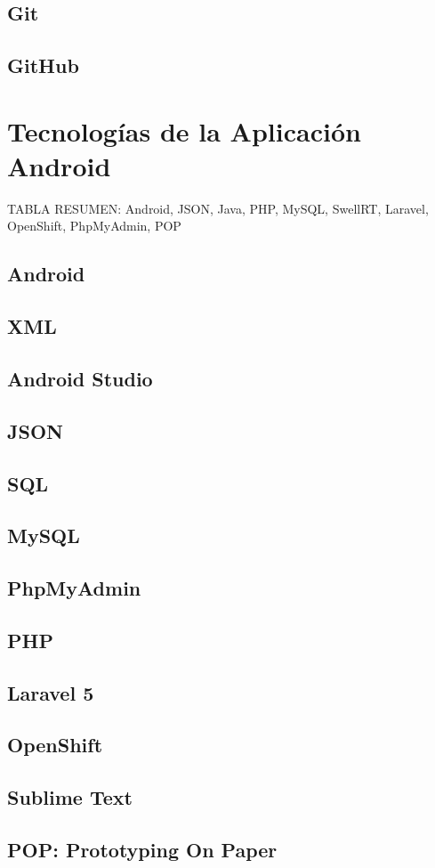    \subsection{Git}\label{ssec:git}  
    \subsection{GitHub}\label{ssec:github}        

\section{Tecnologías de la Aplicación Android}
  
  TABLA RESUMEN: Android, JSON, Java, PHP, MySQL, SwellRT, Laravel, OpenShift, PhpMyAdmin, POP 
    
    \subsection{Android}\label{ssec:android}
    \subsection{XML}\label{ssec:xml}
    \subsection{Android Studio}\label{ssec:androidStudio}
    \subsection{JSON}\label{ssec:json}
    \subsection{SQL}\label{ssec:sql}
    \subsection{MySQL}\label{ssec:mysql}
    \subsection{PhpMyAdmin}\label{ssec:phpmyadmin}
    \subsection{PHP}\label{ssec:php}
    \subsection{Laravel 5}\label{ssec:laravel}
    \subsection{OpenShift}\label{ssec:openshift}
    \subsection{Sublime Text}\label{ssec:sublime}
    \subsection{POP: Prototyping On Paper}\label{ssec:pop}
    